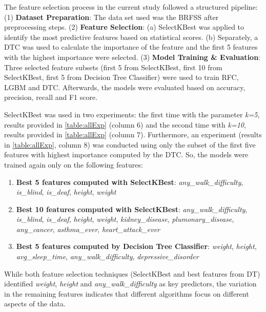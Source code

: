 \documentclass[runningheads]{llncs}
\begin{document}
The feature selection process in the current study followed a structured pipeline: 
(1) \textbf{Dataset Preparation}: The data set used was the BRFSS after preprocessing steps. 
(2) \textbf{Feature Selection}: 
(a) SelectKBest was applied to identify the most predictive features based on statistical scores. 
(b) Separately, a DTC was used to calculate the importance of the feature and the first 5 features with the highest importance were selected. 
(3) \textbf{Model Training \& Evaluation}: Three selected feature subsets (first 5 from SelectKBest, first 10 from SelectKBest, first 5 from Decision Tree Classifier) were used to train RFC, LGBM and DTC. Afterwards, the models were evaluated based on accuracy, precision, recall and F1 score. 


SelectKBest was used in two experiments: the first time with the parameter \textit{k=5}, results provided in \autoref{table:allExp} (column 6) and the second time with \textit{k=10}, results provided in \autoref{table:allExp} (column 7).  
Furthermore, an experiment (results in \autoref{table:allExp}, column 8) was conducted using only the subset of the first five features with highest importance computed by the DTC. So, the models were trained again only on the following features: 

\begin{enumerate}
   \item \textbf{Best 5 features computed with \textbf{SelectKBest}}: 
   \textit{any\_walk\_difficulty},
   \textit{is\_blind},
   \textit{is\_deaf},
    \textit{height}, 
   \textit{weight}
      
    \item \textbf{Best 10 features computed with \textbf{SelectKBest}}:    
   \textit{any\_walk\_difficulty},
   \textit{is\_blind},
   \textit{is\_deaf},
    \textit{height}, 
   \textit{weight},
   \textit{kidney\_disease}, 
    \textit{plumonary\_disease}, 
    \textit{any\_cancer}, 
    \textit{asthma\_ever},
    \textit{heart\_attack\_ever}
    
    
     \item \textbf{Best 5 features computed by Decision Tree Classifier}: 
     \textit{weight}, 
     \textit{height}, 
     \textit{avg\_sleep\_time}, \textit{any\_walk\_difficulty}, \textit{depressive\_disorder}
\end{enumerate}

While both feature selection techniques (SelectKBest and best features from DT) identified \textit{weight}, \textit{height} and \textit{any\_walk\_difficulty} as key predictors, the variation in the remaining features indicates that different algorithms focus on different aspects of the data.
\end{document}
